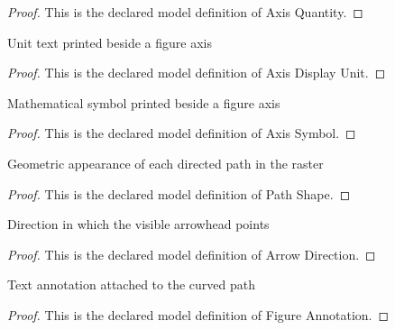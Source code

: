 \begin{proof}
  This is the declared model definition of Axis Quantity.
\end{proof}
\begin{definition}
  \label{def:physics:phyx-mini-0432:phyxminiproblems-problemphyxmini0432-axisdisplayunit}
  Unit text printed beside a figure axis
\end{definition}
\begin{proof}
  This is the declared model definition of Axis Display Unit.
\end{proof}
\begin{definition}
  \label{def:physics:phyx-mini-0432:phyxminiproblems-problemphyxmini0432-axissymbol}
  Mathematical symbol printed beside a figure axis
\end{definition}
\begin{proof}
  This is the declared model definition of Axis Symbol.
\end{proof}
\begin{definition}
  \label{def:physics:phyx-mini-0432:phyxminiproblems-problemphyxmini0432-pathshape}
  Geometric appearance of each directed path in the raster
\end{definition}
\begin{proof}
  This is the declared model definition of Path Shape.
\end{proof}
\begin{definition}
  \label{def:physics:phyx-mini-0432:phyxminiproblems-problemphyxmini0432-arrowdirection}
  Direction in which the visible arrowhead points
\end{definition}
\begin{proof}
  This is the declared model definition of Arrow Direction.
\end{proof}
\begin{definition}
  \label{def:physics:phyx-mini-0432:phyxminiproblems-problemphyxmini0432-figureannotation}
  Text annotation attached to the curved path
\end{definition}
\begin{proof}
  This is the declared model definition of Figure Annotation.
\end{proof}
